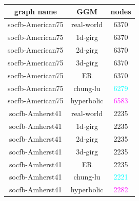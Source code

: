 \begin{table}[]
    \centering
    \begin{tabular}{|c|c|c|}
    \hline
    \textbf{graph name} & \textbf{GGM} & \textbf{nodes} \\ \hline
    \textcolor{ao(english)}{socfb-American75} & \textcolor{ao(english)}{real-world} & \textcolor{ao(english)}{6370} \\ \hline
    socfb-American75 & 1d-girg & 6370 \\ \hline
    socfb-American75 & 2d-girg & 6370 \\ \hline
    socfb-American75 & 3d-girg & 6370 \\ \hline
    socfb-American75 & ER & 6370 \\ \hline
    socfb-American75 & chung-lu & \textcolor{cyan}{6279} \\ \hline
    socfb-American75 & hyperbolic & \textcolor{fuchsia}{6583} \\ \hline
    \textcolor{ao(english)}{socfb-Amherst41} & \textcolor{ao(english)}{real-world} & \textcolor{ao(english)}{2235} \\ \hline
    socfb-Amherst41 & 1d-girg & 2235 \\ \hline
    socfb-Amherst41 & 2d-girg & 2235 \\ \hline
    socfb-Amherst41 & 3d-girg & 2235 \\ \hline
    socfb-Amherst41 & ER & 2235 \\ \hline
    socfb-Amherst41 & chung-lu & \textcolor{cyan}{2221} \\ \hline
    socfb-Amherst41 & hyperbolic & \textcolor{fuchsia}{2282} \\ \hline

\end{tabular}
\end{table}
